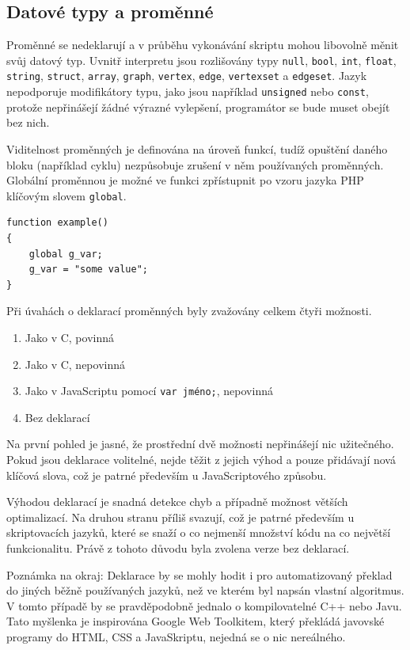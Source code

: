 \documentclass[11pt,twoside,a4paper]{book}
\begin{document}
\subsection{Datové typy a proměnné}
\label{datove_typy_a_promenne}

Proměnné se nedeklarují a v průběhu vykonávání skriptu mohou libovolně měnit svůj datový typ. Uvnitř interpretu jsou rozlišovány typy \texttt{null}, \texttt{bool}, \texttt{int}, \texttt{float}, \texttt{string}, \texttt{struct}, \texttt{array}, \texttt{graph}, \texttt{vertex}, \texttt{edge}, \texttt{vertexset} a \texttt{edgeset}. Jazyk nepodporuje modifikátory typu, jako jsou například \texttt{unsigned} nebo \texttt{const}, protože nepřinášejí žádné výrazné vylepšení, programátor se bude muset obejít bez nich.

Viditelnost proměnných je definována na úroveň funkcí, tudíž opuštění daného bloku (na\-pří\-klad cyklu) nezpůsobuje zrušení v něm používaných proměnných. Globální pro\-měn\-nou je možné ve funkci zpřístupnit po vzoru jazyka PHP klíčovým slovem \texttt{global}.

\begin{verbatim}
function example()
{
    global g_var;
    g_var = "some value";
}
\end{verbatim}

Při úvahách o deklarací proměnných byly zvažovány celkem čtyři možnosti.

\begin{enumerate}
\item Jako v C, povinná
\item Jako v C, nepovinná
\item Jako v JavaScriptu pomocí \texttt{var jméno;}, nepovinná
\item Bez deklarací
\end{enumerate}

Na první pohled je jasné, že prostřední dvě možnosti nepřinášejí nic užitečného. Pokud jsou deklarace volitelné, nejde těžit z jejich výhod a pouze přidávají nová klíčová slova, což je patrné především u JavaScriptového způsobu.

Výhodou deklarací je snadná detekce chyb a případně možnost větších optimalizací. Na druhou stranu příliš svazují, což je patrné především u skriptovacích jazyků, které se snaží o co nejmenší množství kódu na co největší funkcionalitu. Právě z tohoto důvodu byla zvolena verze bez deklarací.

Poznámka na okraj: Deklarace by se mohly hodit i pro automatizovaný překlad do jiných běžně používaných jazyků, než ve kterém byl napsán vlastní algoritmus. V tomto případě by se pravděpodobně jednalo o kompilovatelné C++ nebo Javu. Tato myšlenka je inspirována Google Web Toolkitem, který překládá javovské programy do HTML, CSS a JavaSkriptu, nejedná se o nic nereálného.
\end{document}
